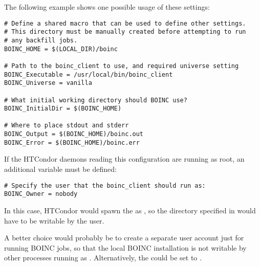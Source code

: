 The following example shows one possible usage of these settings:

\footnotesize
\begin{verbatim}
# Define a shared macro that can be used to define other settings.
# This directory must be manually created before attempting to run
# any backfill jobs.
BOINC_HOME = $(LOCAL_DIR)/boinc

# Path to the boinc_client to use, and required universe setting
BOINC_Executable = /usr/local/bin/boinc_client
BOINC_Universe = vanilla

# What initial working directory should BOINC use?
BOINC_InitialDir = $(BOINC_HOME)

# Where to place stdout and stderr
BOINC_Output = $(BOINC_HOME)/boinc.out
BOINC_Error = $(BOINC_HOME)/boinc.err
\end{verbatim}
\normalsize

If the HTCondor daemons reading this configuration are running as root,
an additional variable must be defined:

\footnotesize
\begin{verbatim}
# Specify the user that the boinc_client should run as:
BOINC_Owner = nobody
\end{verbatim}
\normalsize

In this case, HTCondor would spawn the  as
, so the directory specified in 
would have to be writable by the  user.

A better choice would probably be to create a separate user account
just for running BOINC jobs, so that the local BOINC installation is
not writable by other processes running as .
Alternatively, the  could be set to
. 

\noindent {}

